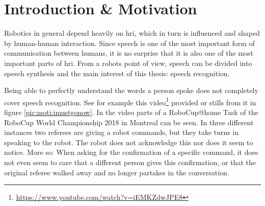 
\chapter{Introduction \& Motivation}
\label{motiv:start}

Robotics in general depend heavily on \gls{hri}, which in turn is influenced and shaped by human-human interaction. %
Since speech is one of the most important form of communication between humans, it is no surprise that it is also one of the most important parts of \gls{hri}.
From a robots point of view, speech can be divided into speech synthesis and the main interest of this thesis: speech recognition.

Being able to perfectly understand the words a person spoke does not completely cover speech recognition.
See for example this video\footnote{\url{https://www.youtube.com/watch?v=iEMKZdwJPE8}} provided or stills from it in figure \ref{pic:moti:imustgonow}.
In the video parts of a RoboCup@home Task of the RoboCup World Championship 2018 in Montreal can be seen.
In three different instances two referees are giving a robot commands, but they take turns in speaking to the robot.
The robot does not acknowledge this nor does it seem to notice.
More so: When asking for the confirmation of a specific command, it does not even seem to care that a different person gives this confirmation, or that the original referee walked away and no longer partakes in the conversation.

